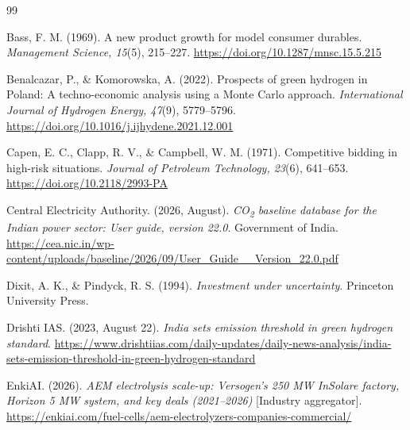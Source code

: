 {\small
\let\origsection\section\renewcommand{\section}[2]{}%
\begin{thebibliography}{99}\setlength{\itemsep}{3.2pt}\raggedright

 Bass, F. M. (1969). A new product growth for model consumer durables. \emph{Management Science, 15}(5), 215--227. \url{https://doi.org/10.1287/mnsc.15.5.215}

 Benalcazar, P., \& Komorowska, A. (2022). Prospects of green hydrogen in Poland: A techno-economic analysis using a Monte Carlo approach. \emph{International Journal of Hydrogen Energy, 47}(9), 5779--5796. \url{https://doi.org/10.1016/j.ijhydene.2021.12.001}

 Capen, E. C., Clapp, R. V., \& Campbell, W. M. (1971). Competitive bidding in high-risk situations. \emph{Journal of Petroleum Technology, 23}(6), 641--653. \url{https://doi.org/10.2118/2993-PA}

 Central Electricity Authority. (2026, August). \emph{CO\textsubscript{2} baseline database for the Indian power sector: User guide, version 22.0}. Government of India. \url{https://cea.nic.in/wp-content/uploads/baseline/2026/09/User_Guide__Version_22.0.pdf}

 Dixit, A. K., \& Pindyck, R. S. (1994). \emph{Investment under uncertainty}. Princeton University Press.

 Drishti IAS. (2023, August 22). \emph{India sets emission threshold in green hydrogen standard}. \url{https://www.drishtiias.com/daily-updates/daily-news-analysis/india-sets-emission-threshold-in-green-hydrogen-standard}

 EnkiAI. (2026). \emph{AEM electrolysis scale-up: Versogen's 250 MW InSolare factory, Horizon 5 MW system, and key deals (2021–2026)} [Industry aggregator]. \url{https://enkiai.com/fuel-cells/aem-electrolyzers-companies-commercial/}


\end{thebibliography}}
